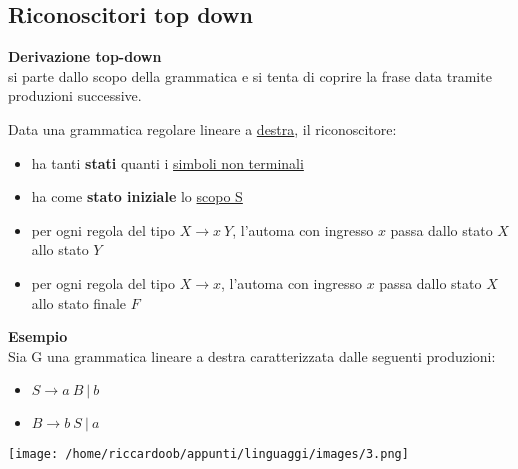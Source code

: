\subsection{Riconoscitori top down}
\textbf{Derivazione top-down}\\
si parte dallo scopo della grammatica e si tenta di coprire la frase data tramite produzioni successive.\\
\begin{multicols}{2}
Data una grammatica regolare lineare a \underline{destra}, il riconoscitore:
\begin{itemize}
    \item ha tanti \textbf{stati} quanti i \underline{simboli non terminali}
    \item ha come \textbf{stato iniziale} lo \underline{scopo S}
    \item per ogni regola del tipo $X \rightarrow x\ Y$, l'automa con ingresso $x$ passa dallo stato $X$ allo stato $Y$
    \item per ogni regola del tipo $X \rightarrow x$, l'automa con ingresso $x$ passa dallo stato $X$ allo stato finale $F$
\end{itemize}
\columnbreak
\textbf{Esempio}\\
Sia G una grammatica lineare a destra caratterizzata dalle seguenti produzioni:
\begin{itemize}
    \item $S \rightarrow a\ B\ |\ b$
    \item $B \rightarrow b\ S\ |\ a$
\end{itemize}
\begin{multicolfigure}
    \centering
    \texttt{[image: /home/riccardoob/appunti/linguaggi/images/3.png]}
\end{multicolfigure}
\end{multicols}


